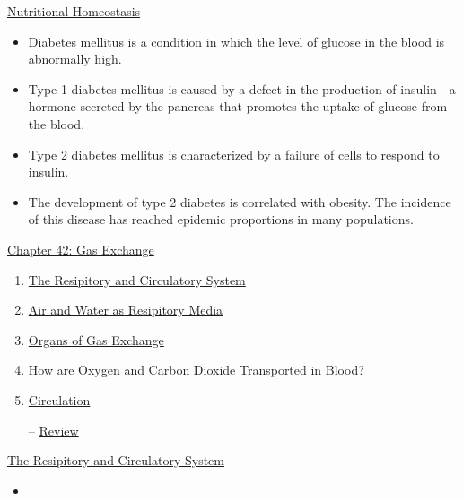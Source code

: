 \documentclass[12pt,letterpaper]{article}
\newcommand{\thetitle}{\hypertarget{home}{Animals and Ecology}}
\begin{document}
    \hyperlink{41.4}{Nutritional Homeostasis}
    \begin{itemize}
        \item Diabetes mellitus is a condition in which the level of glucose in the blood is abnormally high.
        \item Type 1 diabetes mellitus is caused by a defect in the production of insulin—a hormone secreted by the pancreas that promotes the uptake of glucose from the blood.
        \item Type 2 diabetes mellitus is characterized by a failure of cells to respond to insulin.
        \item The development of type 2 diabetes is correlated with obesity. The incidence of this disease has reached epidemic proportions in many populations.
    \end{itemize}




\clearpage

\renewcommand{\thetitle}{\hypertarget{42}{Gas Exchange}}
\hypertarget{42}{}
\setcounter{section}{42}

\begin{chapbox}{\hyperlink{home}{Chapter 42: Gas Exchange}}
    \begin{enumerate}
        \item \hyperlink{42.1}{The Resipitory and Circulatory System}
        \item \hyperlink{42.2}{Air and Water as Resipitory Media}
        \item \hyperlink{42.3}{Organs of Gas Exchange}
        \item \hyperlink{42.4}{How are Oxygen and Carbon Dioxide Transported in Blood?}
        \item \hyperlink{42.5}{Circulation}
        \item [--] \hyperlink{42.r}{Review}
    \end{enumerate}
\end{chapbox}

\hypertarget{42.1}{}
\begin{secbox}{\hyperlink{42}{The Resipitory and Circulatory System}}{
    \begin{itemize}
        \item
    \end{itemize}
}\end{secbox}
\end{document}
